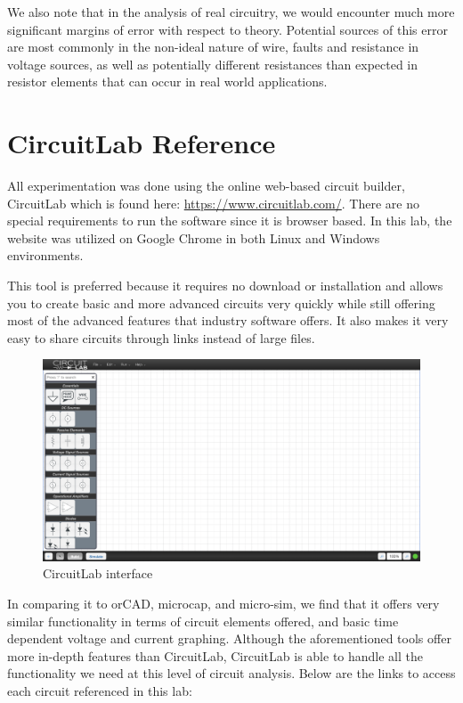\documentclass[12pt]{article}
\begin{document}
We also note that in the analysis of real circuitry, we would encounter much more significant margins of error with respect to theory. Potential sources of this error are most commonly in the non-ideal nature of wire, faults and resistance in voltage sources, as well as potentially different resistances than expected in resistor elements that can occur in real world applications.

\pagebreak

\section{CircuitLab Reference}
All experimentation was done using the online web-based circuit builder, CircuitLab which is found here: \url{https://www.circuitlab.com/}. There are no special requirements to run the software since it is browser based. In this lab, the website was utilized on Google Chrome in both Linux and Windows environments.

This tool is preferred because it requires no download or installation and allows you to create basic and more advanced circuits very quickly while still offering most of the advanced features that industry software offers. It also makes it very easy to share circuits through links instead of large files.

\begin{figure}[H]
    \begin{center}
        \includegraphics[scale=0.3]{circuit-lab.png}
        \caption { CircuitLab interface}
    \end{center}
\end{figure}

In comparing it to orCAD, microcap, and micro-sim, we find that it offers very similar functionality in terms of circuit elements offered, and basic time dependent voltage and current graphing. Although the aforementioned tools offer more in-depth features than CircuitLab, CircuitLab is able to handle all the functionality we need at this level of circuit analysis.
Below are the links to access each circuit referenced in this lab:
\end{document}
